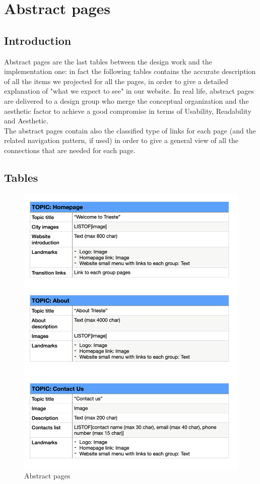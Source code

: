 \documentclass[table, 12pt]{article}
\begin{document}
\newpage
\section{Abstract pages}
\subsection{Introduction}
Abstract pages are the last tables between the design work and the implementation one: in fact the following tables contains the accurate description of all the items we projected for all the pages, in order to give a detailed explanation of "what we expect to see" in our website. In real life, abstract pages are delivered to a design group who merge the conceptual organization and the aesthetic factor to achieve a good compromise in terms of Usability, Readability and Aesthetic. \\
The abstract pages contain also the classified type of links for each page (and the related navigation pattern, if used) in order to give a general view of all the connections that are needed for each page.
\subsection{Tables}
\begin{figure}[H]
    \begin{center}
        \includegraphics[width=\textwidth]{assets/Tables/Abstract/abstractPage1.png}
        \caption{Abstract pages}
    \end{center}
\end{figure}
\end{document}

